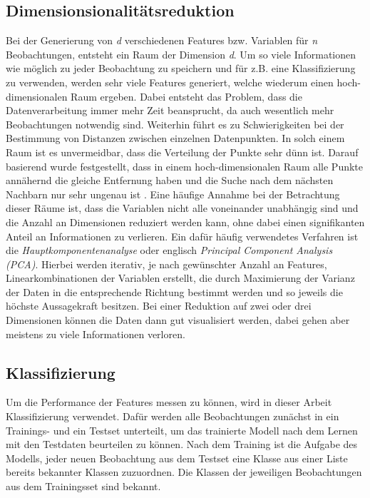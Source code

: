 \subsection{Dimensionsionalitätsreduktion}
Bei der Generierung von \textit{d} verschiedenen Features bzw. Variablen für \textit{n} Beobachtungen, entsteht ein Raum der Dimension \textit{d}. 
Um so viele Informationen wie möglich zu jeder Beobachtung zu speichern und für z.B. eine Klassifizierung zu verwenden, werden sehr viele Features generiert, welche wiederum einen hoch-dimensionalen Raum ergeben. Dabei entsteht das Problem, dass die Datenverarbeitung immer mehr Zeit beansprucht, da auch wesentlich mehr Beobachtungen notwendig sind. Weiterhin führt es zu Schwierigkeiten bei der Bestimmung von Distanzen zwischen einzelnen Datenpunkten. In solch einem Raum ist es unvermeidbar, dass die Verteilung der Punkte sehr dünn ist. Darauf basierend wurde festgestellt, dass in einem hoch-dimensionalen Raum alle Punkte annähernd die gleiche Entfernung haben und die Suche nach dem nächsten Nachbarn nur sehr ungenau ist \cite{hinneburg2000nearest}. Eine häufige Annahme bei der Betrachtung dieser Räume ist, dass die Variablen nicht alle voneinander unabhängig sind und die Anzahl an Dimensionen reduziert werden kann, ohne dabei einen signifikanten Anteil an Informationen zu verlieren. Ein dafür häufig verwendetes Verfahren ist die \emph{Hauptkomponentenanalyse} oder englisch \emph{Principal Component Analysis (PCA)}. Hierbei werden iterativ, je nach gewünschter Anzahl an Features, Linearkombinationen der Variablen erstellt, die durch Maximierung der Varianz der Daten in die entsprechende Richtung bestimmt werden und so jeweils die höchste Aussagekraft besitzen. Bei einer Reduktion auf zwei oder drei Dimensionen können die Daten dann gut visualisiert werden, dabei gehen aber meistens zu viele Informationen verloren.

\subsection{Klassifizierung}
Um die Performance der Features messen zu können, wird in dieser Arbeit Klassifizierung verwendet. Dafür werden alle Beobachtungen zunächst in ein Trainings- und ein Testset unterteilt, um das trainierte Modell nach dem Lernen mit den Testdaten beurteilen zu können. Nach dem Training ist die Aufgabe des Modells, jeder neuen Beobachtung aus dem Testset eine Klasse aus einer Liste bereits bekannter Klassen zuzuordnen. Die Klassen der jeweiligen Beobachtungen aus dem Trainingsset sind bekannt.

